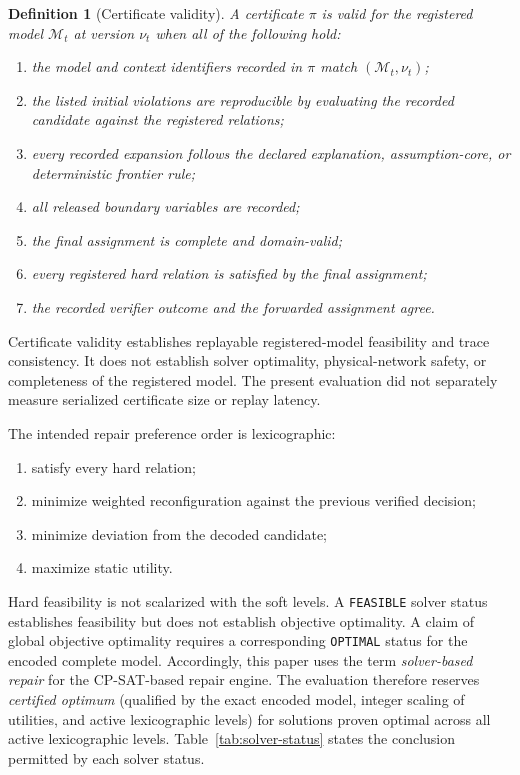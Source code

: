 \documentclass[pdflatex,sn-mathphys-num,iicol,oneside]{sn-jnl}
\newcommand{\cpsat}{\textsc{CP-SAT}\xspace}
\newtheorem{definition}{Definition}
\begin{document}
\begin{definition}[Certificate validity]
\label{def:certificate}
A certificate $\pi$ is \emph{valid} for the registered model
$\mathcal{M}_t$ at version $\nu_t$ when all of the following hold:
\begin{enumerate}[label=(\arabic*),leftmargin=2.0em]
\item the model and context identifiers recorded in $\pi$ match
$(\mathcal{M}_t,\nu_t)$;
\item the listed initial violations are reproducible by evaluating
the recorded candidate against the registered relations;
\item every recorded expansion follows the declared explanation,
assumption-core, or deterministic frontier rule;
\item all released boundary variables are recorded;
\item the final assignment is complete and domain-valid;
\item every registered hard relation is satisfied by the final
assignment;
\item the recorded verifier outcome and the forwarded assignment
agree.
\end{enumerate}
\end{definition}

Certificate validity establishes replayable registered-model
feasibility and trace consistency. It does not establish solver
optimality, physical-network safety, or completeness of the
registered model. The present evaluation did not separately measure
serialized certificate size or replay latency.

The intended repair preference order is lexicographic:

\begin{enumerate}
\item satisfy every hard relation;
\item minimize weighted reconfiguration against the previous verified
decision;
\item minimize deviation from the decoded candidate;
\item maximize static utility.
\end{enumerate}

Hard feasibility is not scalarized with the soft levels. A
\texttt{FEASIBLE} solver status establishes feasibility but does not
establish objective optimality. A claim of global objective
optimality requires a corresponding \texttt{OPTIMAL} status for the
encoded complete model. Accordingly, this paper uses
the term \emph{solver-based repair} for the \cpsat-based repair
engine. The evaluation therefore reserves \emph{certified optimum} (qualified by the exact encoded model, integer scaling of utilities, and active lexicographic levels)
for solutions proven optimal across all active lexicographic levels.
Table~\ref{tab:solver-status} states the conclusion permitted by each
solver status.
\end{document}
